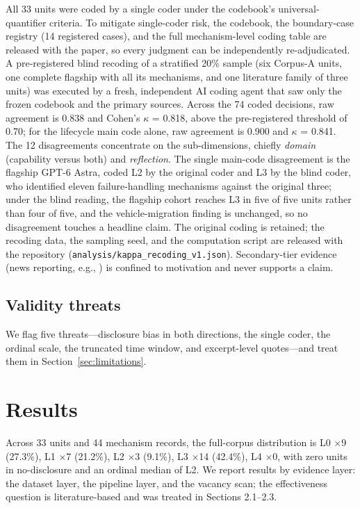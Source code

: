 \documentclass[10pt]{article}
\begin{document}
All 33 units were coded by a single coder under the codebook's universal-quantifier criteria. To mitigate single-coder risk, the codebook, the boundary-case registry (14 registered cases), and the full mechanism-level coding table are released with the paper, so every judgment can be independently re-adjudicated. A pre-registered blind recoding of a stratified 20\% sample (six Corpus-A units, one complete flagship with all its mechanisms, and one literature family of three units) was executed by a fresh, independent AI coding agent that saw only the frozen codebook and the primary sources. Across the 74 coded decisions, raw agreement is 0.838 and Cohen's $\kappa$ = 0.818, above the pre-registered threshold of 0.70; for the lifecycle main code alone, raw agreement is 0.900 and $\kappa$ = 0.841. The 12 disagreements concentrate on the sub-dimensions, chiefly \emph{domain} (capability versus both) and \emph{reflection}. The single main-code disagreement is the flagship GPT-6 Astra, coded L2 by the original coder and L3 by the blind coder, who identified eleven failure-handling mechanisms against the original three; under the blind reading, the flagship cohort reaches L3 in five of five units rather than four of five, and the vehicle-migration finding is unchanged, so no disagreement touches a headline claim. The original coding is retained; the recoding data, the sampling seed, and the computation script are released with the repository (\texttt{analysis/kappa\_recoding\_v1.json}). Secondary-tier evidence (news reporting, e.g., \cite{waic2026}) is confined to motivation and never supports a claim.

\subsection{Validity threats}

We flag five threats---disclosure bias in both directions, the single coder, the ordinal scale, the truncated time window, and excerpt-level quotes---and treat them in Section~\ref{sec:limitations}.

\section{Results}\label{sec:results}

Across 33 units and 44 mechanism records, the full-corpus distribution is L0 $\times$9 (27.3\%), L1 $\times$7 (21.2\%), L2 $\times$3 (9.1\%), L3 $\times$14 (42.4\%), L4 $\times$0, with zero units in no-disclosure and an ordinal median of L2. We report results by evidence layer: the dataset layer, the pipeline layer, and the vacancy scan; the effectiveness question is literature-based and was treated in Sections 2.1--2.3.
\end{document}
